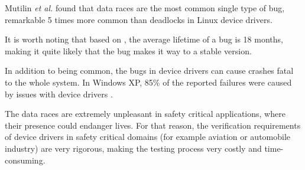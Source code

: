\documentclass[..thesis.tex]{subfiles}
\begin{document}
Mutilin \textit{et al.} \cite{mutilin_analysis_2012} found that data races are the most common single type of bug, remarkable 5 times more common than deadlocks in Linux device drivers.

It is worth noting that based on \cite{chou_empirical_2001,palix_faults_2011}, the average lifetime of a bug is 18 months, making it quite likely that the bug makes it way to a stable version. 


In addition to being common, the bugs in device drivers can cause crashes fatal to the whole system. In Windows XP, 85\% of the reported failures were caused by issues with device drivers \cite{swift_improving_2003}.

The data races are extremely unpleasant in safety critical applications, where their presence could endanger lives. For that reason, the verification requirements of device drivers in safety critical domains (for example aviation or automobile industry) are very rigorous, making the testing process very costly and time-consuming.






\end{document}
